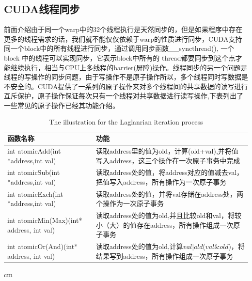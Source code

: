 \subsection{CUDA线程同步}
前面介绍由于同一个warp中的32个线程执行是天然同步的，但是如果程序中存在更多的线程需求的话，我们就不能仅仅依赖于warp的性质进行同步，CUDA支持同一个block中的所有线程进行同步，通过调用同步函数\_\_syncthread(), 一个block 中的线程可以实现同步，它表示block中所有的 thread都要同步到这个点才能继续执行，相当与CPU上多线程的barrier(屏障)操作。线程同步的另一个问题是线程的写操作的同步问题，由于写操作不是原子操作所以，多个线程同时写数据是不安全的。CUDA提供了一系列的原子操作来对多个线程间的共享数据的读写进行互斥保护，原子操作保证每次只有一个线程对共享数据进行读写操作,下表列出了一些常见的原子操作已经其功能介绍。
\begin{table}[t]
\newcommand{\tabincell}[2]{\begin{tabular}{@{}#1@{}}#2\end{tabular}}
\setlength{\abovecaptionskip}{0.2cm}
\scriptsize{
\renewcommand{\tabcolsep}{0.09cm}
\renewcommand{\arraystretch}{0.8}
\centering
\begin{tabular}{|p{6cm}<{\centering}|p{6cm}<{\centering}|}
\hline 函数名称& 功能\\ \hline
int atomicAdd(int *address,int val)&读取address里的值为old，计算(old+val),并将值写入address，这三个操作在一次原子事务中完成\\ \hline
int atomicSub(int *address,int val)&读取address处的值，将address对应的值减去val，把值写入address，所有操作为一次原子事务\\ \hline
int atomicExch(int *address,int val)&读取address处的值，并将val存储在address处，两个操作为一次原子事务\\ \hline
int atomicMin(Max)(int* address, int val)&读取address处的值为old,并且比较old和val，将较小（大）的值存在address，所有操作组成一次原子事务\\ \hline
int atomicOr(And)(int* address, int val)&读取address处的值为old,计算$val|old$($val \& old$)，将结果写到address，所有操作组成一次原子事务\\ \hline
\end{tabular}
  cm
  \caption{The illustration for the Laglanrian iteration process}
  \label{Iterprocess}
}
\end{table}
